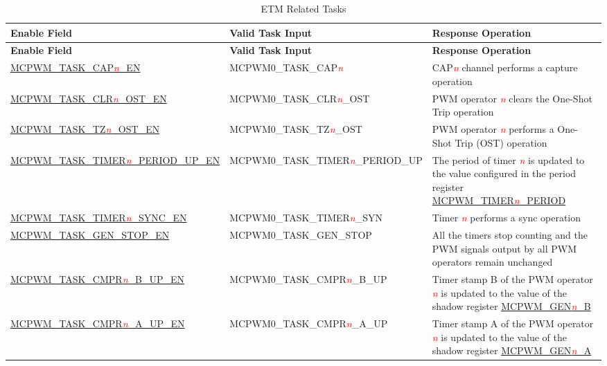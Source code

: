 \begin{longtable}{ | l | l | L{5cm} |}
    \caption{ETM Related Tasks}
    \label{tab:mcpwm-etm-task}
    \\\hline
   \textbf{Enable Field} & \textbf{Valid Task Input} & \textbf{Response Operation} \\\hline
    \endfirsthead
    \hline
    \textbf{Enable Field} & \textbf{Valid Task Input} & \textbf{Response Operation} \\\hline
    \endhead
    \hline
    \endfoot
    
    \hyperref[fielddesc:MCPWMTASKCAP0EN]{MCPWM\_TASK\_CAP\textcolor{red}{\it{n}}\_EN}
    &  MCPWM0\_TASK\_CAP\textcolor{red}{\it{n}}
    &  CAP\textcolor{red}{\it{n}} channel performs a capture operation \\\hline
    \hyperref[fielddesc:MCPWMTASKCLR0OSTEN]{MCPWM\_TASK\_CLR\textcolor{red}{\it{n}}\_OST\_EN}
    &  MCPWM0\_TASK\_CLR\textcolor{red}{\it{n}}\_OST
    &  PWM operator \textcolor{red}{\it{n}} clears the One-Shot Trip operation \\\hline
    \hyperref[fielddesc:MCPWMTASKTZ0OSTEN]{MCPWM\_TASK\_TZ\textcolor{red}{\it{n}}\_OST\_EN}
    &  MCPWM0\_TASK\_TZ\textcolor{red}{\it{n}}\_OST
    &  PWM operator \textcolor{red}{\it{n}} performs a One-Shot Trip (OST) operation \\\hline
    \hyperref[fielddesc:MCPWMTASKTIMER0PERIODUPEN]{MCPWM\_TASK\_TIMER\textcolor{red}{\it{n}}\_PERIOD\_UP\_EN}
    &  MCPWM0\_TASK\_TIMER\textcolor{red}{\it{n}}\_PERIOD\_UP
    &  The period of timer \textcolor{red}{\it{n}} is updated to the value configured in the period register \hyperref[fielddesc:MCPWMTIMERNPERIOD]{MCPWM\_TIMER\textcolor{red}{\it{n}}\_PERIOD} \\\hline
    \hyperref[fielddesc:MCPWMTASKTIMER0SYNCEN]{MCPWM\_TASK\_TIMER\textcolor{red}{\it{n}}\_SYNC\_EN}
    &  MCPWM0\_TASK\_TIMER\textcolor{red}{\it{n}}\_SYN
    &  Timer \textcolor{red}{\it{n}} performs a sync operation \\\hline
    \hyperref[fielddesc:MCPWMTASKGENSTOPEN]{MCPWM\_TASK\_GEN\_STOP\_EN}
    &  MCPWM0\_TASK\_GEN\_STOP
    &  All the timers stop counting and the PWM signals output by all PWM operators remain unchanged \\\hline
    \hyperref[fielddesc:MCPWMTASKCMPR0BUPEN]{MCPWM\_TASK\_CMPR\textcolor{red}{\it{n}}\_B\_UP\_EN}
    &  MCPWM0\_TASK\_CMPR\textcolor{red}{\it{n}}\_B\_UP
    &  Timer stamp B of the PWM operator \textcolor{red}{\it{n}} is updated to the value of the shadow register \hyperref[regdesc:MCPWMGENNBREG]{MCPWM\_GEN\textcolor{red}{\it{n}}\_B} \\\hline
    \hyperref[fielddesc:MCPWMTASKCMPR0AUPEN]{MCPWM\_TASK\_CMPR\textcolor{red}{\it{n}}\_A\_UP\_EN}
    &  MCPWM0\_TASK\_CMPR\textcolor{red}{\it{n}}\_A\_UP
    &  Timer stamp A of the PWM operator \textcolor{red}{\it{n}} is updated to the value of the shadow register \hyperref[regdesc:MCPWMGENNAREG]{MCPWM\_GEN\textcolor{red}{\it{n}}\_A} \\\hline
\end{longtable}